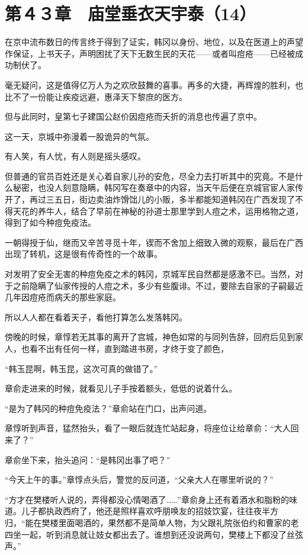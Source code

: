 \section{第４３章　庙堂垂衣天宇泰（14）}

在京中流布数日的传言终于得到了证实，韩冈以身份、地位，以及在医道上的声望作保证，上书天子，声明困扰了天下无数生民的天花——或者叫痘疮——已经被成功制伏了。

毫无疑问，这是值得亿万人为之欢欣鼓舞的喜事。再多的大捷，再辉煌的胜利，也比不了一份能让疾疫远避，惠泽天下黎庶的医方。

但与此同时，皇第七子建国公赵价因痘疮而夭折的消息也传遍了京中。

这一天，京城中弥漫着一股诡异的气氛。

有人笑，有人忧，有人则是摇头感叹。

但普通的官员百姓还是关心着自家儿孙的安危，尽全力去打听其中的究竟。不是什么秘密，也没人刻意隐瞒，韩冈写在奏章中的内容，当天午后便在京城官宦人家传开了，再过三五日，街边卖油炸馉饳儿的小贩，多半都能知道韩冈在广西发现了不得天花的养牛人，结合了早前在神秘的孙道士那里学到人痘之术，运用格物之道，得到了如今种痘免疫法。

一朝得授于仙，继而又辛苦寻觅十年，锲而不舍加上细致入微的观察，最后在广西出现了转机，这是很有传奇性的一个故事。

对发明了安全无害的种痘免疫之术的韩冈，京城军民自然都是感激不已。当然，对于之前隐瞒了仙家传授的人痘之术，多少有些腹诽。不过，要除去自家的子嗣最近几年因痘疮而病夭的那些家庭。

所以人人都在看着天子，看他打算怎么发落韩冈。

傍晚的时候，章惇若无其事的离开了宫城，神色如常的与同列告辞，回府后见到家人，也看不出有任何一样，直到踏进书房，才终于变了颜色，

“韩玉昆啊，韩玉昆，这次可真的做错了。”

章俞走进来的时候，就看见儿子手按着额头，低低的说着什么。

“是为了韩冈的种痘免疫法？”章俞站在门口，出声问道。

章惇听到声音，猛然抬头，看了一眼后就连忙站起身，将座位让给章俞：“大人回来了？”

章俞坐下来，抬头追问：“是韩冈出事了吧？”

“今天上午的事。”章惇点头后，警觉的反问道，“父亲大人在哪里听说的？”

“方才在樊楼听人说的，弄得都没心情喝酒了……”章俞身上还有着酒水和脂粉的味道。儿子都执政西府了，他还是照样喜欢呼朋唤友的招妓饮宴，往往夜半方归，“能在樊楼里面喝酒的，果然都不是简单人物，为父跟礼院张伯约和曹家的老四坐一起，听到消息就让妓女都出去了。谁想到还没说两句，樊楼上下都没了丝弦声。”

